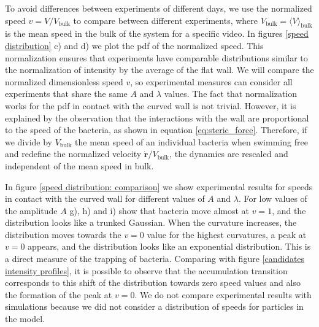 To avoid differences between experiments of different days, we use the normalized speed $v=V/V_{\text{bulk}}$ to compare between different experiments, where $V_{\text{bulk}} = \langle V \rangle_{\text{bulk}}$ is the mean speed in the bulk of the system for a specific video. In figures \ref{speed distribution} c) and d) we plot the pdf of the normalized speed. This normalization ensures that experiments have comparable distributions similar to the normalization of intensity by the average of the flat wall. We will compare the normalized dimensionless speed $v$, so experimental measures can consider all experiments that share the same $A$ and $\lambda$ values. The fact that normalization works for the pdf in contact with the curved wall is not trivial. However, it is explained by the observation that the interactions with the wall are proportional to the speed of the bacteria, as shown in equation \eqref{eq:steric_force}. Therefore, if we divide by $V_{\text{bulk}}$ the mean speed of an individual bacteria when swimming free and redefine the normalized velocity $\dot{\textbf{r}}/V_{\text{bulk}}$, the dynamics are rescaled and independent of the mean speed in bulk.


In figure \ref{speed distribution: comparison} we show experimental results for speeds in contact with the curved wall for different values of $A$ and $\lambda$. For low values of the amplitude $A$ g), h) and i) show that bacteria move almost at $v=1$, and the distribution looks like a trunked Gaussian. When the curvature increases, the distribution moves towards the $v=0$ value for the highest curvatures, a peak at $v=0$ appears, and the distribution looks like an exponential distribution. This is a direct measure of the trapping of bacteria. Comparing with figure \ref{candidates intensity profiles}, it is possible to observe that the accumulation transition corresponds to this shift of the distribution towards zero speed values and also the formation of the peak at $v=0$. We do not compare experimental results with simulations because we did not consider a distribution of speeds for particles in the model.

